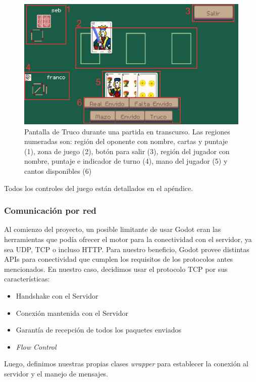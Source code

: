 \begin{figure}[htbp]
    \centering
    \includegraphics[width=1.0\textwidth]{../assets/godot-truco.png}
    \caption{Pantalla de Truco durante una partida en transcurso. 
             Las regiones numeradas son: región del oponente con nombre, cartas y puntaje (1),
             zona de juego (2), botón para salir (3), región del jugador con nombre, puntaje e
             indicador de turno (4), mano del jugador (5) y cantos disponibles (6)}
    \label{fig:truco-game}
\end{figure}

Todos los controles del juego están detallados en el apéndice.


\subsubsection{Comunicación por red}

\noindent Al comienzo del proyecto, un posible limitante de usar Godot eran las herramientas que podía ofrecer 
el motor para la conectividad con el servidor, ya sea UDP, TCP o incluso HTTP. 
Para nuestro beneficio, Godot provee distintas APIs para conectividad que cumplen los requisitos
de los protocolos antes mencionados. En nuestro caso, decidimos usar el protocolo TCP por sus características:
\begin{itemize}
    \item Handshake con el Servidor
    \item Conexión mantenida con el Servidor
    \item Garantía de recepción de todos los paquetes enviados
    \item \textit{Flow Control}
\end{itemize}

Luego, definimos nuestras propias clases \textit{wrapper} para establecer la conexión al servidor y el 
manejo de mensajes. 

